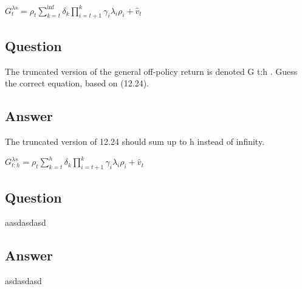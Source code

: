 \documentclass[11pt]{article}
\begin{document}
    \noindent $ G_{t}^{\lambda s} = \rho_{t} \sum_{k=t}^{\inf} \delta_{k} \prod_{i=t+1}^{k} \gamma_{i} \lambda_{i} \rho_{i} + \hat{v}_{t} $


    \subsection{Question}

    The truncated version of the general off-policy return is denoted G t:h .
    Guess the correct equation, based on (12.24).

    \subsection*{Answer}

    \noindent The truncated version of 12.24 should sum up to h instead of infinity.

    \noindent $ G_{t:h}^{\lambda s} = \rho_{t} \sum_{k=t}^{h} \delta_{k} \prod_{i=t+1}^{k} \gamma_{i} \lambda_{i} \rho_{i} + \hat{v}_{t} $

    \subsection{Question}

    aasdasdasd

    \subsection*{Answer}

    asdasdasd
\end{document}
